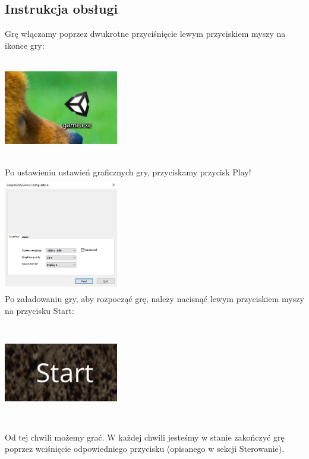 \documentclass[12pt,a4paper]{article}
\newcommand{\si}{ś}
\begin{document}
	\subsection*{Instrukcja obsługi}
	Grę włączamy poprzez dwukrotne przyci\si nięcie lewym przyciskiem myszy na ikonce gry:\\
	\includegraphics[height=5cm, width=5cm]{4.jpg}\\
	Po ustawieniu ustawień graficznych gry, przyciskamy przycisk Play! \\
	\includegraphics[height=5cm, width=5cm]{4i5.jpg}\\
	Po załadowaniu gry, aby rozpocząć grę, należy nacisnąć lewym przyciskiem myszy na przycisku Start: \\
	\includegraphics[height=5cm, width=5cm]{5.jpg}\\
	
	Od tej chwili możemy grać. W każdej chwili jeste\si my w stanie zakończyć grę poprzez wci\si nięcie odpowiedniego przycisku (opisanego w sekcji Sterowanie).
\end{document}
